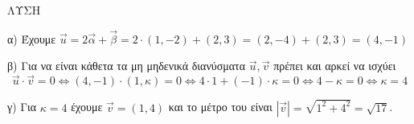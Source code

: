 ΛΥΣΗ

α) Έχουμε $\vec{u}=2\vec{\alpha}+\vec{\beta} = 2\cdot(1, -2)+(2, 3)=(2, -4)+(2, 3)=(4, -1)$

β) Για να είναι κάθετα τα μη μηδενικά διανύσματα $\vec{u}, \vec{v}$ πρέπει και αρκεί να ισχύει
\[ \vec{u}\cdot\vec{v}=0 \Leftrightarrow (4, -1)\cdot(1, \kappa)=0 \Leftrightarrow 4\cdot 1+(-1)\cdot \kappa=0 \Leftrightarrow 4-\kappa=0 \Leftrightarrow \kappa=4 \]

γ) Για $\kappa=4$ έχουμε $\vec{v}=(1, 4)$ και το μέτρο του είναι $\left|\vec{v}\right|=\sqrt{1^2+4^2}=\sqrt{17}$.